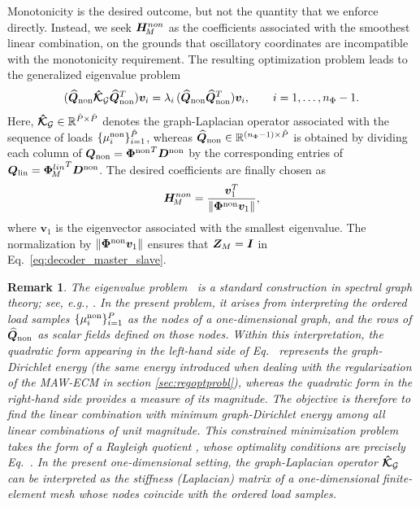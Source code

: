 \documentclass[preprint,10pt]{elsarticle}  %
\newtheorem{remark}{Remark}
\begin{document}
  Monotonicity is the desired outcome, but not the quantity that we
enforce directly. Instead, we seek  $\bm{H}_{\!M}^{non}$ as the coefficients associated
with the smoothest linear combination, on the grounds that oscillatory coordinates are incompatible with the
monotonicity requirement. The   resulting optimization problem leads to  the generalized eigenvalue
problem
\begin{equation}
\label{eq:damage_graph_eig}
(\widehat{\bm{Q}}_{\mathrm{non}}\boldsymbol{\mathcal{\hat{K}}}_{\mathcal{G}}\widehat{\bm{Q}}_{\mathrm{non}}^{T})\bm{v}_i
=
\lambda_i\,
(\widehat{\bm{Q}}_{\mathrm{non}}\widehat{\bm{Q}}_{\mathrm{non}}^{T})\bm{v}_i,
\qquad
i=1,\ldots,n_{\Phi}-1.
\end{equation}
Here, $\boldsymbol{\mathcal{\hat{K}}}_{\mathcal{G}} \in \mathbb{R}^{\hat{P} \times \hat{P}}$ denotes the graph-Laplacian operator  associated with the sequence of loads
\(\{\mu_{i}^{\mathrm{non}}\}_{i=1}^{\hat{P}}\), whereas $\widehat{\bm{Q}}_{\mathrm{non}}\in\mathbb{R}^{(n_{\Phi}-1) \times \hat{P}}$ is obtained by dividing each column of $\bm{Q}_{\mathrm{non}} = {\boldsymbol{\Phi}^{\mathrm{non}}}^T \bm{D}^{\mathrm{non}}$ by the corresponding entries of $\bm{Q}_{\mathrm{lin}} = {\bm{\Phi}_{\!M}^{lin}}^T \bm{D}^{\mathrm{non}}$.
 The desired coefficients are finally chosen as
\begin{equation}
\label{eq:aplha}
\bm{H}_{\!M}^{non}
=
\dfrac{\bm{v}_1^T}
{\Vert \boldsymbol{\Phi}^{\mathrm{non}} \bm{v}_1 \Vert},
\end{equation}
where \(\bm{v}_1\) is the eigenvector associated with the smallest
eigenvalue. The normalization by
\(\Vert \boldsymbol{\Phi}^{\mathrm{non}} \bm{v}_1 \Vert\) ensures that
\(\bm{Z}_{M}=\bm{I}\) in Eq.~\ref{eq:decoder_master_slave}.

 \begin{remark}
The eigenvalue problem~ is a standard
construction in spectral graph theory; see, e.g.,
\cite{spielman2019spectral}. In the present problem, it arises from interpreting the ordered
load samples \(\{\mu_{i}^{\mathrm{non}}\}_{i=1}^{P}\) as the nodes of a
one-dimensional graph, and the rows of \(\widehat{\bm{Q}}_{\mathrm{non}}\) as scalar fields
defined on those nodes. Within this interpretation, the quadratic form
appearing in the left-hand side of Eq.~  represents the
graph-Dirichlet energy (the same energy introduced when dealing with the regularization of the MAW-ECM in section \ref{sec:regoptprobl}), whereas the
quadratic form  in the right-hand side provides a
measure of its magnitude. The objective is therefore to find the
linear combination with minimum graph-Dirichlet energy among all
linear combinations of unit magnitude. This constrained minimization
problem takes the form of a Rayleigh quotient \cite{spielman2019spectral}, whose optimality
conditions are precisely Eq.~. In the present one-dimensional setting, the graph-Laplacian operator $\boldsymbol{\mathcal{\hat{K}}}_{\mathcal{G}}$ can be interpreted as the stiffness (Laplacian) matrix  of a one-dimensional finite-element mesh whose nodes coincide with the ordered load samples.
\end{remark}
\end{document}
